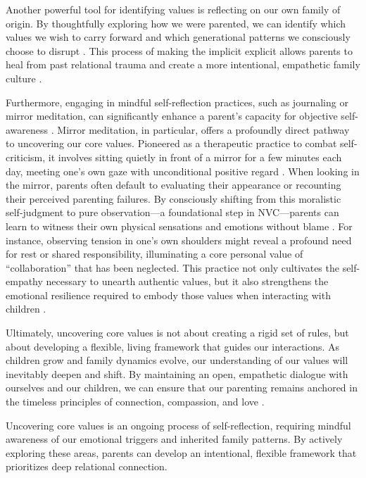 Another powerful tool for identifying values is reflecting on our own family of origin.
By thoughtfully exploring how we were parented, we can identify which values we wish to carry forward and which generational patterns we consciously choose to disrupt \citep{siegel2003}.
This process of making the implicit explicit allows parents to heal from past relational trauma and create a more intentional, empathetic family culture \citep{vanderkolk2014}.

Furthermore, engaging in mindful self-reflection practices, such as journaling or mirror meditation, can significantly enhance a parent's capacity for objective self-awareness \citep{well2022}.
Mirror meditation, in particular, offers a profoundly direct pathway to uncovering our core values.
Pioneered as a therapeutic practice to combat self-criticism, it involves sitting quietly in front of a mirror for a few minutes each day, meeting one's own gaze with unconditional positive regard \citep{well2022}.
When looking in the mirror, parents often default to evaluating their appearance or recounting their perceived parenting failures.
By consciously shifting from this moralistic self-judgment to pure observation---a foundational step in NVC---parents can learn to witness their own physical sensations and emotions without blame \citep{rosenberg2003}.
For instance, observing tension in one's own shoulders might reveal a profound need for rest or shared responsibility, illuminating a core personal value of ``collaboration'' that has been neglected.
This practice not only cultivates the self-empathy necessary to unearth authentic values, but it also strengthens the emotional resilience required to embody those values when interacting with children \citep{well2022}.

Ultimately, uncovering core values is not about creating a rigid set of rules, but about developing a flexible, living framework that guides our interactions.
As children grow and family dynamics evolve, our understanding of our values will inevitably deepen and shift.
By maintaining an open, empathetic dialogue with ourselves and our children, we can ensure that our parenting remains anchored in the timeless principles of connection, compassion, and love \citep{rosenberg2003}.

\begin{keyinsight}
Uncovering core values is an ongoing process of self-reflection, requiring mindful awareness of our emotional triggers and inherited family patterns.
By actively exploring these areas, parents can develop an intentional, flexible framework that prioritizes deep relational connection.
\end{keyinsight}

